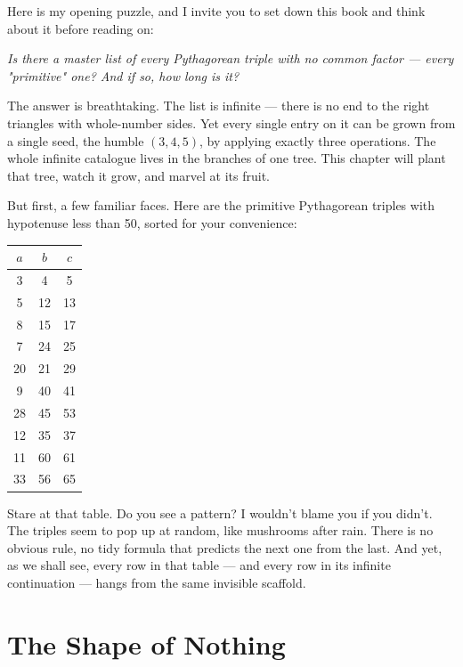 Here is my opening puzzle, and I invite you to set down this book and think about it before reading on:


\begin{displayquote}
\textit{Is there a master list of every Pythagorean triple with no common factor --- every "primitive" one? And if so, how long is it?}
\end{displayquote}


The answer is breathtaking. The list is infinite --- there is no end to the right triangles with whole-number sides. Yet every single entry on it can be grown from a single seed, the humble $(3, 4, 5)$, by applying exactly three operations. The whole infinite catalogue lives in the branches of one tree. This chapter will plant that tree, watch it grow, and marvel at its fruit.

But first, a few familiar faces. Here are the primitive Pythagorean triples with hypotenuse less than 50, sorted for your convenience:

\begin{center}
\small
\begin{tabular}{c c c}
\toprule
$a$ & $b$ & $c$ \\
\midrule
3 & 4 & 5 \\
5 & 12 & 13 \\
8 & 15 & 17 \\
7 & 24 & 25 \\
20 & 21 & 29 \\
9 & 40 & 41 \\
28 & 45 & 53 \\
12 & 35 & 37 \\
11 & 60 & 61 \\
33 & 56 & 65 \\
\bottomrule
\end{tabular}
\end{center}

Stare at that table. Do you see a pattern? I wouldn't blame you if you didn't. The triples seem to pop up at random, like mushrooms after rain. There is no obvious rule, no tidy formula that predicts the next one from the last. And yet, as we shall see, every row in that table --- and every row in its infinite continuation --- hangs from the same invisible scaffold.

\bigskip

\section*{The Shape of Nothing}

